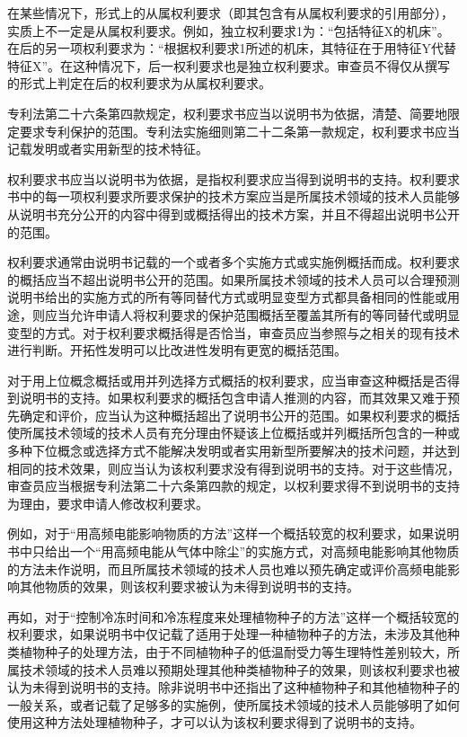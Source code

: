 在某些情况下，形式上的从属权利要求（即其包含有从属权利要求的引用部分），实质上不一定是从属权利要求。例如，独立权利要求1为：“包括特征X的机床”。在后的另一项权利要求为：“根据权利要求1所述的机床，其特征在于用特征Y代替特征X”。在这种情况下，后一权利要求也是独立权利要求。审查员不得仅从撰写的形式上判定在后的权利要求为从属权利要求。

专利法第二十六条第四款规定，权利要求书应当以说明书为依据，清楚、简要地限定要求专利保护的范围。专利法实施细则第二十二条第一款规定，权利要求书应当记载发明或者实用新型的技术特征。

权利要求书应当以说明书为依据，是指权利要求应当得到说明书的支持。权利要求书中的每一项权利要求所要求保护的技术方案应当是所属技术领域的技术人员能够从说明书充分公开的内容中得到或概括得出的技术方案，并且不得超出说明书公开的范围。

权利要求通常由说明书记载的一个或者多个实施方式或实施例概括而成。权利要求的概括应当不超出说明书公开的范围。如果所属技术领域的技术人员可以合理预测说明书给出的实施方式的所有等同替代方式或明显变型方式都具备相同的性能或用途，则应当允许申请人将权利要求的保护范围概括至覆盖其所有的等同替代或明显变型的方式。对于权利要求概括得是否恰当，审查员应当参照与之相关的现有技术进行判断。开拓性发明可以比改进性发明有更宽的概括范围。

对于用上位概念概括或用并列选择方式概括的权利要求，应当审查这种概括是否得到说明书的支持。如果权利要求的概括包含申请人推测的内容，而其效果又难于预先确定和评价，应当认为这种概括超出了说明书公开的范围。如果权利要求的概括使所属技术领域的技术人员有充分理由怀疑该上位概括或并列概括所包含的一种或多种下位概念或选择方式不能解决发明或者实用新型所要解决的技术问题，并达到相同的技术效果，则应当认为该权利要求没有得到说明书的支持。对于这些情况，审查员应当根据专利法第二十六条第四款的规定，以权利要求得不到说明书的支持为理由，要求申请人修改权利要求。

例如，对于“用高频电能影响物质的方法”这样一个概括较宽的权利要求，如果说明书中只给出一个“用高频电能从气体中除尘”的实施方式，对高频电能影响其他物质的方法未作说明，而且所属技术领域的技术人员也难以预先确定或评价高频电能影响其他物质的效果，则该权利要求被认为未得到说明书的支持。

再如，对于“控制冷冻时间和冷冻程度来处理植物种子的方法”这样一个概括较宽的权利要求，如果说明书中仅记载了适用于处理一种植物种子的方法，未涉及其他种类植物种子的处理方法，由于不同植物种子的低温耐受力等生理特性差别较大，所属技术领域的技术人员难以预期处理其他种类植物种子的效果，则该权利要求也被认为未得到说明书的支持。除非说明书中还指出了这种植物种子和其他植物种子的一般关系，或者记载了足够多的实施例，使所属技术领域的技术人员能够明了如何使用这种方法处理植物种子，才可以认为该权利要求得到了说明书的支持。

